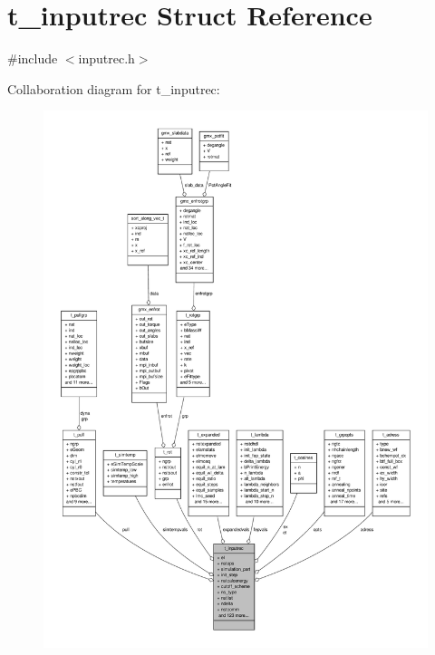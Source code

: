 \hypertarget{structt__inputrec}{\section{t\-\_\-inputrec \-Struct \-Reference}
\label{structt__inputrec}
}


{\ttfamily \#include $<$inputrec.\-h$>$}



\-Collaboration diagram for t\-\_\-inputrec\-:
\nopagebreak
\begin{figure}[H]
\begin{center}
\leavevmode
\includegraphics[width=350pt]{structt__inputrec__coll__graph}
\end{center}
\end{figure}
